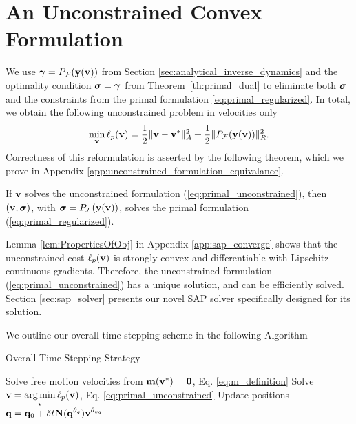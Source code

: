 
\section{An Unconstrained Convex Formulation}
\label{sec:unconstrained_convex_formulation}

We use ${\bm\gamma} = P_{\mathcal{F}}({\mathbf{y}}({\mathbf{v}}))$ from Section
\ref{sec:analytical_inverse_dynamics} and the optimality condition ${\bm{\sigma}}
= {\bm\gamma}$ from Theorem~\ref{th:primal_dual} to eliminate both ${\bm{\sigma}}$ and
the constraints from the primal formulation \eqref{eq:primal_regularized}. In
total, we obtain the following unconstrained problem in velocities only
\begin{eqnarray}
	\min_{\mf{v}} \ell_p(\mf{v}) = \frac{1}{2}\Vert\mf{v}-\mf{v}^*\Vert_{A}^2 +
	\frac{1}{2}\Vert P_\mathcal{F}(\mf{y}(\mf{v}))\Vert_R^2.
	\label{eq:primal_unconstrained}
\end{eqnarray}
Correctness of this reformulation is asserted by the following theorem, which we
prove in Appendix \ref{app:unconstrained_formulation_equivalance}.
\begin{theorem}
  If  ${\mathbf{v}}$ solves the unconstrained formulation
    (\ref{eq:primal_unconstrained}), then $({\mathbf{v}}, {\bm\sigma})$, with ${\bm\sigma}
    =P_\mathcal{F}({\mathbf{y}}({\mathbf{v}}))$, solves the primal formulation
    (\ref{eq:primal_regularized}).
    \label{th:unconstrained_formulation_equivalance}
\end{theorem}
Lemma \ref{lem:PropertiesOfObj} in Appendix \ref{app:sap_converge} shows that
the unconstrained cost $\ell_p({\mathbf{v}})$ is strongly convex and differentiable
with Lipschitz continuous gradients. Therefore, the unconstrained formulation
(\ref{eq:primal_unconstrained}) has a unique solution, and can be efficiently
solved.  
Section \ref{sec:sap_solver} presents our novel SAP solver specifically designed
for its solution.

We outline our overall time-stepping scheme in the following Algorithm
\begin{algorithm}[H]
	\caption{Overall Time-Stepping Strategy}
	  \label{alg:sap_time_stepping}
	  \begin{algorithmic}[1]
		  \State Solve free motion velocities from
		  ${\mathbf{m}}({\mathbf{v}}^*)={\mathbf{0}}$, Eq. \eqref{eq:m_definition}
		  \State Solve $\displaystyle {\mathbf{v}} = \operatorname*{arg\,min}_{{\mathbf{v}}} \ell_p({\mathbf{v}})$, Eq. \eqref{eq:primal_unconstrained}
		  \State Update positions $\displaystyle {\mathbf{q}} = {\mathbf{q}}_0 + \delta t{\mathbf{N}}({\mathbf{q}}^{\theta_{q}}){\mathbf{v}}^{\theta_{vq}}$ 	
	  \end{algorithmic}
\end{algorithm}

